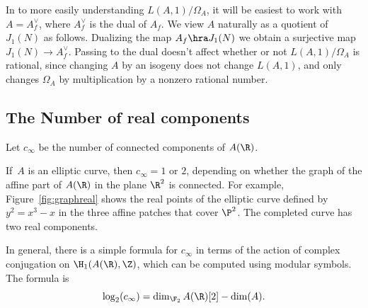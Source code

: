\documentclass{report}
\begin{document}
In to more easily understanding $L(A,1)/\Omega_A$, it will be easiest
to work with $A=A_f^{\vee}$, where $A_f^{\vee}$ is the dual of $A_f$.
We view $A$ naturally as a quotient of $J_1(N)$ as follows.  Dualizing
the map $A_f\hra J_1(N)$ we obtain a surjective map $J_1(N)\to
A_f^{\vee}$.  Passing to the dual doesn't affect whether or not
$L(A,1)/\Omega_A$ is rational, since changing $A$ by an isogeny does
not change $L(A,1)$, and only changes $\Omega_A$ by multiplication by
a nonzero rational number.


\subsection{The Number of real components}
\begin{definition}
Let $c_\infty$ be the number of connected components of $A(\R)$.
\end{definition}
If~$A$ is an elliptic curve, then $c_\infty=1$ or $2$, depending on
whether the graph of the affine part of $A(\R)$ in the plane $\R^2$ is
connected.  For example, Figure~\ref{fig:graphreal} shows the real
points of the elliptic curve defined by $y^2=x^3-x$ in the three
affine patches that cover $\P^2$.  The completed curve has two real
components.

In general, there is a simple formula for $c_\infty$ in
terms of the action of complex conjugation on $\H_1(A(\R),\Z)$, which
can be computed using modular symbols.  The formula is
$$
  \log_2(c_\infty) = \dim_{\F_2} A(\R)[2] - \dim(A).
$$
\end{document}

